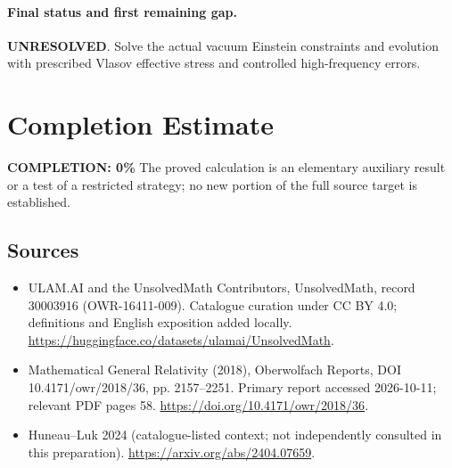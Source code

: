\documentclass[11pt]{article}
\begin{document}
\paragraph{Final status and first remaining gap.}
\textbf{UNRESOLVED}. Solve the actual vacuum Einstein constraints and evolution with prescribed Vlasov effective stress and controlled high-frequency errors.

\section{Completion Estimate}
\noindent\textbf{COMPLETION: 0\%}
The proved calculation is an elementary auxiliary result or a test of a restricted strategy; no new portion of the full source target is established.

\subsection{Sources}
\begin{itemize}
\item[\hypertarget{source:30003916:1}{S1}] ULAM.AI and the UnsolvedMath Contributors, UnsolvedMath, record 30003916 (OWR-16411-009). Catalogue curation under CC BY 4.0; definitions and English exposition added locally.
\url{https://huggingface.co/datasets/ulamai/UnsolvedMath}.
\item[\hypertarget{source:30003916:2}{S2}] Mathematical General Relativity (2018), Oberwolfach Reports, DOI 10.4171/owr/2018/36, pp. 2157--2251. Primary report accessed 2026-10-11; relevant PDF pages 58.
\url{https://doi.org/10.4171/owr/2018/36}.
\item[\hypertarget{source:30003916:3}{S3}] Huneau--Luk 2024 (catalogue-listed context; not independently consulted in this preparation).
\url{https://arxiv.org/abs/2404.07659}.
\end{itemize}
\label{end:30003916}
\end{document}
